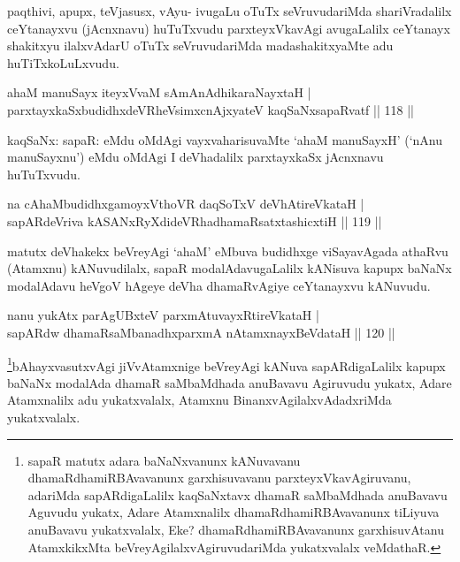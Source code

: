 \begin{artha}
paqthivi, apupx, teVjasusx, vAyu- ivugaLu oTuTx seVruvudariMda shariVradalilx ceYtanayxvu (jAcnxnavu) huTuTxvudu parxteyxVkavAgi avugaLalilx ceYtanayx shakitxyu ilalxvAdarU oTuTx seVruvudariMda madashakitxyaMte adu huTiTxkoLuLxvudu.
\end{artha}


\begin{shl}
ahaM manuSayx iteyxVvaM sAmAnAdhikaraNayxtaH | \\
parxtayxkaSxbudidhxdeVRheV\s simxcnAjxyateV kaqSaNxsapaRvatf \hfill||  118 ||  
\end{shl}

\begin{artha}
kaqSaNx: sapaR: eMdu oMdAgi vayxvaharisuvaMte `ahaM manuSayxH' (`nAnu manuSayxnu') eMdu oMdAgi I deVhadalilx parxtayxkaSx jAcnxnavu huTuTxvudu.
\end{artha}

\begin{shl}
na cAhaMbudidhxgamoyxV\s thoVR daqSoTxV deVhAtireVkataH | \\
sapARdeVriva kASANxRyXdideVRhadhamaRsatxtashicxtiH \hfill||  119 ||  
\end{shl}

\begin{artha}
matutx deVhakekx beVreyAgi `ahaM' eMbuva budidhxge viSayavAgada athaRvu (Atamxnu) kANuvudilalx, sapaR modalAdavugaLalilx kANisuva kapupx baNaNx modalAdavu heVgoV hAgeye deVha dhamaRvAgiye ceYtanayxvu kANuvudu.
\end{artha}


\begin{shl}
nanu yukAtx parAgUBxteV parxmAtuvayxRtireVkataH | \\
sapARdw dhamaRsaMbanadhxparxmA nA\s \s tamxnayxBeVdataH \hfill||  120 ||  
\end{shl}

\begin{artha}
\footnote{sapaR matutx adara baNaNxvanunx kANuvavanu dhamaRdhamiRBAvavanunx garxhisuvavanu parxteyxVkavAgiruvanu, adariMda sapARdigaLalilx kaqSaNxtavx dhamaR saMbaMdhada anuBavavu Aguvudu yukatx, Adare Atamxnalilx dhamaRdhamiRBAvavanunx tiLiyuva anuBavavu yukatxvalalx, Eke? dhamaRdhamiRBAvavanunx garxhisuvAtanu AtamxkikxMta beVreyAgilalxvAgiruvudariMda yukatxvalalx veMdathaR.}bAhayxvasutxvAgi jiVvAtamxnige beVreyAgi kANuva sapARdigaLalilx kapupx baNaNx modalAda dhamaR saMbaMdhada anuBavavu Agiruvudu yukatx, Adare Atamxnalilx adu yukatxvalalx, Atamxnu BinanxvAgilalxvAdadxriMda yukatxvalalx.
\end{artha}

